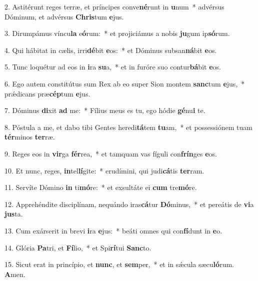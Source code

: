 2. Astitérunt reges terræ, et príncipes conve\textbf{né}runt in \textbf{u}num~*  advérsus Dóminum, et advérsus \textbf{Chris}tum \textbf{e}jus.\

3. Dirumpámus víncu\textbf{la} e\textbf{ó}rum:~*  et projiciámus a nobis \textbf{ju}gum ip\textbf{só}rum.\

4. Qui hábitat in cælis, irri\textbf{dé}bit \textbf{e}os:~*  et Dóminus subsan\textbf{ná}bit \textbf{e}os.\

5. Tunc loquétur ad eos in \textbf{i}ra \textbf{su}a,~*  et in furóre suo contur\textbf{bá}bit \textbf{e}os.\

6. Ego autem constitútus sum Rex ab eo super Sion montem \textbf{sanc}tum \textbf{e}jus,~*  prǽdicans præ\textbf{cép}tum \textbf{e}jus.\

7. Dóminus \textbf{di}xit \textbf{ad} me:~*  Fílius meus es tu, ego hódie \textbf{gé}nu\textbf{i} te.\

8. Póstula a me, et dabo tibi Gentes heredi\textbf{tá}tem \textbf{tu}am,~*  et possessiónem tuam \textbf{tér}minos \textbf{ter}ræ.\

9. Reges eos in \textbf{vir}ga \textbf{fér}rea,~*  et tamquam vas fíguli con\textbf{frín}ges \textbf{e}os.\

10. Et nunc, reges, \textbf{in}tel\textbf{lí}gite:~*  erudímini, qui judi\textbf{cá}tis \textbf{ter}ram.\

11. Servíte Dómino \textbf{in} ti\textbf{mó}re:~*  et exsultáte ei \textbf{cum} tre\textbf{mó}re.\

12. Apprehéndite disciplínam, nequándo iras\textbf{cá}tur \textbf{Dó}minus,~*  et pereátis de \textbf{vi}a \textbf{jus}ta.\

13. Cum exárserit in brevi \textbf{i}ra \textbf{e}jus:~*  beáti omnes qui con\textbf{fí}dunt in \textbf{e}o.\

14. Glória \textbf{Pa}tri, et \textbf{Fí}lio,~*  et Spi\textbf{rí}tui \textbf{Sanc}to.\

15. Sicut erat in princípio, et \textbf{nunc}, et \textbf{sem}per,~*  et in sǽcula sæcu\textbf{ló}rum. \textbf{A}men.\

